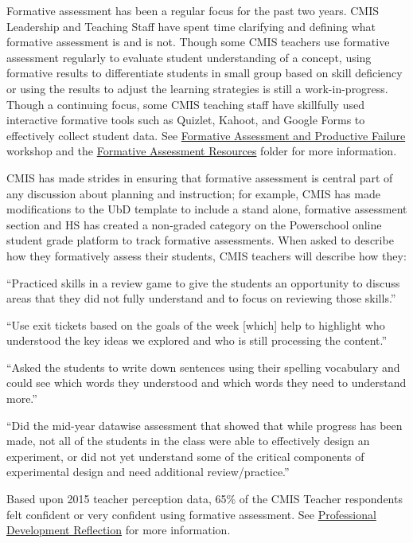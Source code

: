 \documentclass{report}
\begin{document}
\begin{findings}
Formative assessment has been a regular focus for the past two years. CMIS Leadership and Teaching Staff have spent time clarifying and defining what formative assessment is and is not. Though some CMIS teachers use formative assessment regularly to evaluate student understanding of a concept,  using formative results to differentiate students in small group based on skill deficiency or using the results to adjust the learning strategies is still a work-in-progress. Though a continuing focus, some CMIS teaching staff have skillfully used interactive formative tools such as Quizlet, Kahoot, and Google Forms to effectively collect student data. See \href{https://docs.google.com/a/cmis.ac.th/presentation/d/1S1x1yEj7KDD6jM7u1RdTZJEt10_0r6mcJ-LmRb6iPWs/edit?usp=sharing}{Formative Assessment and Productive Failure} workshop and the \href{https://drive.google.com/drive/folders/0ByVFfrm0zfolaFNZMDVFZnFLazA?usp=sharing}{Formative Assessment Resources} folder for more information. 

CMIS has made strides in ensuring that formative assessment is central part of any discussion about planning and instruction; for example, CMIS has made modifications to the UbD template  to include a stand alone, formative assessment section and HS has created a non-graded category on the Powerschool online student grade platform to track formative assessments. When asked to describe how they formatively assess their students, CMIS teachers will describe how they:

``Practiced skills in a review game to give the students an opportunity to discuss areas that they did  not fully understand and to focus on reviewing those skills.''

``Use exit tickets based on the goals of the week [which] help to highlight who understood the key ideas we explored and who is still processing the content.''

``Asked the students to write down sentences using their spelling vocabulary and could see which words they understood and which words they need to understand more.''

``Did the mid-year datawise assessment that showed that while progress has been made, not all of the students in the class were able to effectively design an experiment, or did not yet understand some of the critical components of experimental design and need additional review/practice.''

Based upon 2015 teacher perception data, 65\% of the CMIS Teacher respondents felt confident or very confident using formative assessment. See \href{https://docs.google.com/a/cmis.ac.th/forms/d/1-00JLey-jyLuizymm8z8JGJ6iLp4l-ccsTgHJ_Ckcj8/viewanalytics}{Professional Development Reflection} for more information. 


\end{findings}
\end{document}
